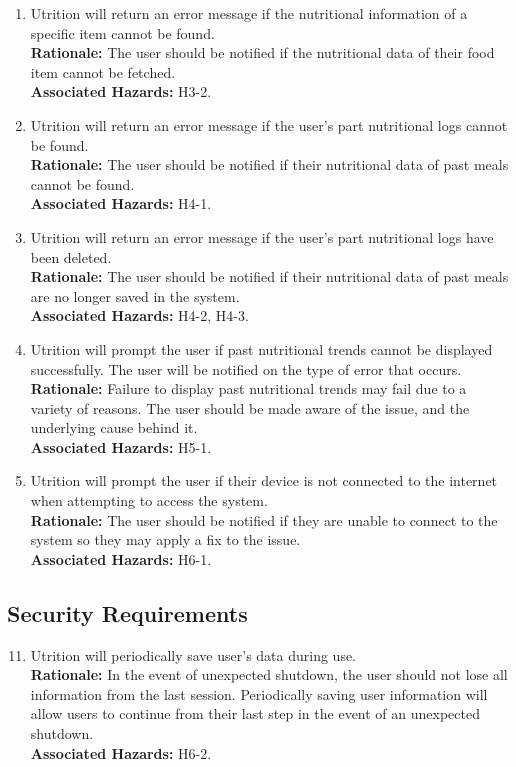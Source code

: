 \documentclass{article}
\begin{document}
\begin{enumerate}[{SR}1.]
	\item Utrition will return an error message if the nutritional information 
	of a specific item cannot be found.\\
	\textbf{Rationale:}  The user should be notified if the nutritional data of 
	their food item cannot be fetched.\\
	\textbf{Associated Hazards:} H3-2.
	
	\item Utrition will return an error message if the user's part nutritional 
	logs cannot be found.\\
	\textbf{Rationale:}  The user should be notified if their nutritional data 
	of past meals cannot be found.\\
	\textbf{Associated Hazards:} H4-1.
	
	\item Utrition will return an error message if the user's part nutritional 
	logs have been deleted.\\
	\textbf{Rationale:}  The user should be notified if their nutritional data 
	of past meals are no longer saved in the system.\\
	\textbf{Associated Hazards:} H4-2, H4-3.
	
	\item Utrition will prompt the user if past nutritional trends cannot
	be displayed successfully. The user will be notified on the type of error 
	that occurs. \\
	\textbf{Rationale:}  Failure to display past nutritional trends may fail 
	due to a variety of reasons. The user should be made aware of the issue, 
	and the underlying cause behind it.\\	
	\textbf{Associated Hazards:} H5-1.
	
	\item Utrition will prompt the user if their device is not connected to the 
	internet when attempting to access the system. \\
	\textbf{Rationale:}  The user should be notified if they are unable to 
	connect to the system so they may apply a fix to the issue. \\	
	\textbf{Associated Hazards:} H6-1.
\end{enumerate}

\subsection{Security Requirements}
\begin{enumerate}[{SR}1.] 
	\setcounter{enumi}{10}
	
	\item Utrition will periodically save user’s data during use. \\
	\textbf{Rationale:} In the event of unexpected shutdown, the user should 
	not lose all information from the last session. Periodically saving user 
	information will allow users to continue from their last step in the event 
	of an unexpected shutdown. \\	
	\textbf{Associated Hazards:} H6-2.
\end{enumerate}
\end{document}
